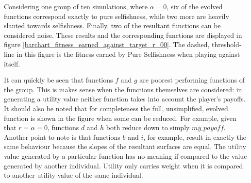 \documentclass[11pt]{book}
\newcommand*{\np}{\par\noindent\newline}
\begin{document}
\np Considering one group of ten simulations, where $\alpha = 0$, six of the evolved functions correspond exactly to pure selfishness, while two more are heavily slanted towards selfishness.
Finally, two of the resultant functions can be considered noise.
These results and the corresponding functions are displayed in figure \ref{barchart_fitness_earned_against_target_r_00}.
The dashed, threshold-line in this figure is the fitness earned by Pure Selfishness when playing against itself.

\np It can quickly be seen that functions $f$ and $g$ are poorest performing functions of the group.
This is makes sense when the functions themselves are considered: in generating a utility value neither function takes into account the player's payoffs.
It should also be noted that for completeness the full, unsimplified, evolved function is shown in the figure when some can be reduced.
For example, given that $r=\alpha=0$, functions $d$ and $h$ both reduce down to simply $my\_payoff$.
Another point to note is that functions $b$ and $i$, for example, result in exactly the same behaviour because the slopes of the resultant surfaces are equal.
The utility value generated by a particular function has no meaning if compared to the value generated by another individual.
Utility only carries weight when it is compared to another utility value of the same individual. 
\end{document}
